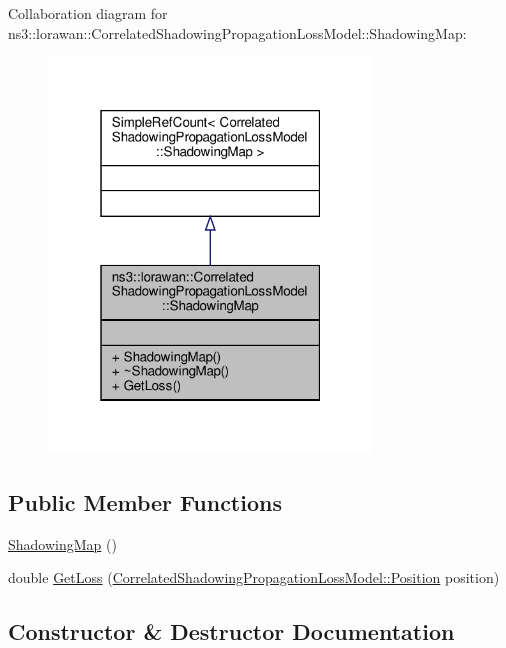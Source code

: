 Collaboration diagram for ns3\+:\+:lorawan\+:\+:Correlated\+Shadowing\+Propagation\+Loss\+Model\+:\+:Shadowing\+Map\+:
\nopagebreak
\begin{figure}[H]
\begin{center}
\leavevmode
\includegraphics[width=244pt]{classns3_1_1lorawan_1_1CorrelatedShadowingPropagationLossModel_1_1ShadowingMap__coll__graph}
\end{center}
\end{figure}
\subsection*{Public Member Functions}
\begin{DoxyCompactItemize}
\item 
\hyperlink{classns3_1_1lorawan_1_1CorrelatedShadowingPropagationLossModel_1_1ShadowingMap_a0b41986aceed196271b44b2d087e58e1}{Shadowing\+Map} ()
\item 
double \hyperlink{classns3_1_1lorawan_1_1CorrelatedShadowingPropagationLossModel_1_1ShadowingMap_a683e51a85e85fc9638a915e5de90679d}{Get\+Loss} (\hyperlink{classns3_1_1lorawan_1_1CorrelatedShadowingPropagationLossModel_1_1Position}{Correlated\+Shadowing\+Propagation\+Loss\+Model\+::\+Position} position)
\end{DoxyCompactItemize}


\subsection{Constructor \& Destructor Documentation}
\mbox{\label{classns3_1_1lorawan_1_1CorrelatedShadowingPropagationLossModel_1_1ShadowingMap_a0b41986aceed196271b44b2d087e58e1}} 
